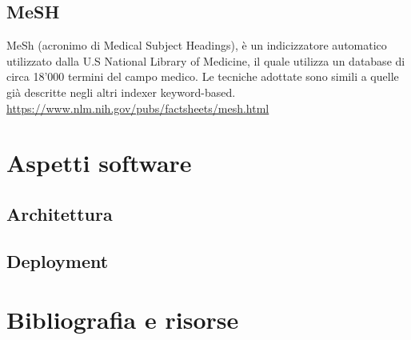 \documentclass{article}
\theoremstyle{plain}
\theoremstyle{definition}
\begin{document}
\subsection{MeSH}
MeSh (acronimo di Medical Subject Headings), è un indicizzatore automatico utilizzato dalla U.S National Library of Medicine, il quale utilizza un database di circa 18'000 termini del campo medico. Le tecniche adottate sono simili a quelle già descritte negli altri indexer keyword-based.
\url{https://www.nlm.nih.gov/pubs/factsheets/mesh.html}


\newpage
\section{Aspetti software}
\subsection{Architettura}
\subsection{Deployment}

\newpage
\section{Bibliografia e risorse}
\end{document}
